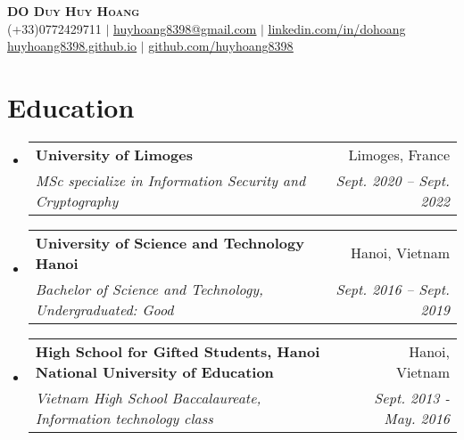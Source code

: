 \documentclass[letterpaper,11pt]{article}
\makeatletter
\newcommand{\resumeSubheading}[4]{
  \vspace{-2pt}\item
  \begin{tabular*}{0.97\textwidth}[t]{l@{\extracolsep{\fill}}r}
      \textbf{#1} & #2 \\
      \textit{\small#3} & \textit{\small #4} \\
    \end{tabular*}\vspace{-7pt}
}
\newcommand{\resumeSubHeadingListStart}{\begin{itemize}[leftmargin=0.15in, label={}]}
\newcommand{\resumeSubHeadingListEnd}{\end{itemize}}
\makeatother
\begin{document}

\begin{center}
    \textbf{\Huge \scshape DO Duy Huy Hoang} \\ \vspace{1pt}
    \small (+33)0772429711 $|$ \href{mailto:huyhoang8398@gmail.com}{\underline{huyhoang8398@gmail.com}} $|$ 
    \href{https://linkedin.com/in/dohoang}{\underline{linkedin.com/in/dohoang}}\\
    \href{https://huyhoang8398.github.io}{\underline{huyhoang8398.github.io}} $|$
    \href{https://github.com/huyhoang8398}{\underline{github.com/huyhoang8398}}
\end{center}

\section{Education}
  \resumeSubHeadingListStart
    \resumeSubheading
      {University of Limoges}{Limoges, France}
      {MSc specialize in Information Security and Cryptography}{Sept. 2020 -- Sept. 2022}
    \resumeSubheading
      {University of Science and Technology Hanoi}{Hanoi, Vietnam}
      {Bachelor of Science and Technology, Undergraduated: Good}{Sept. 2016 -- Sept. 2019}
    \resumeSubheading
      {High School for Gifted Students, Hanoi National University of Education}{Hanoi, Vietnam}
      {Vietnam High School Baccalaureate, Information technology class}{Sept. 2013 - May. 2016}
  \resumeSubHeadingListEnd

\end{document}
